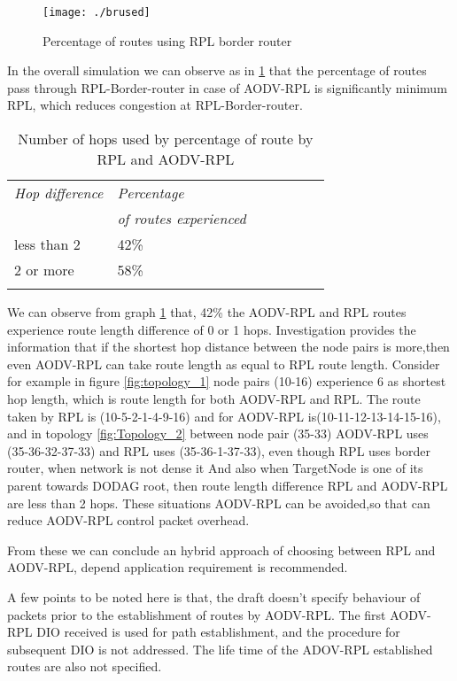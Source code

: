 \documentclass[conference, letterpaper]{IEEEtran}
\begin{document}
\begin{figure}[h!]
\texttt{[image: ./brused]}
\caption{Percentage of routes using RPL border router}
\label{fig:brused}
\end{figure}
In the overall simulation we can observe as in \ref{fig:brused} that the
percentage of routes pass through RPL-Border-router in case of AODV-RPL is
significantly minimum RPL, which reduces congestion at  RPL-Border-router.


\begin{table}[h!] 
\centering 
\begin{tabular}{lllllll} 
\toprule 
\emph{Hop difference } & \emph{Percentage }  \\
\emph{ } & \emph{of routes experienced} \\
\midrule less than 2 &  42\% & \\ 2 or more & 58\%  \\
\bottomrule \\ 
\end{tabular}
\caption{Number of hops used by percentage of route by RPL and AODV-RPL} \label{tab:hops-difd} 
\end{table}


We can observe from  graph \ref{tab:hops-difd} that, 42\% the AODV-RPL and RPL routes  experience route length difference of  0 or 1 hops. Investigation provides the information that if the shortest hop distance between the node pairs is more,then even AODV-RPL can take route length as equal to RPL route length.
Consider for example in figure \ref{fig:topology_1} node pairs (10-16)
experience 6 as shortest hop length, which is route length for both AODV-RPL
and RPL. The route taken by RPL is (10-5-2-1-4-9-16) and for AODV-RPL is(10-11-12-13-14-15-16), and in topology \ref{fig:Topology_2} between node pair (35-33) AODV-RPL uses (35-36-32-37-33)  and RPL uses (35-36-1-37-33),  even though RPL uses border router, when network is not dense it   
And also when TargetNode is one of its parent towards
DODAG root, then route length difference RPL and AODV-RPL are less than 2 hops.
These situations AODV-RPL can be avoided,so that can reduce AODV-RPL control
packet overhead.

From these we can conclude an hybrid approach of choosing between RPL and
AODV-RPL, depend application requirement  is recommended.

A few points to be noted here is that, the draft \cite{I-D.ietf-roll-aodv-rpl}
doesn't specify behaviour of packets prior to the establishment of routes by
AODV-RPL. The first AODV-RPL DIO received is used for path establishment, and
the procedure for subsequent DIO is not addressed. The life time of the
ADOV-RPL established routes are also not specified.
\end{document}
